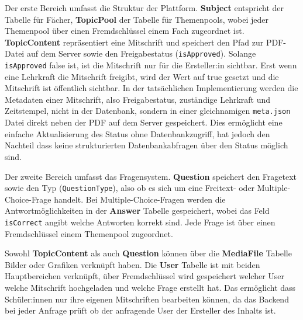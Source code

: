 Der erste Bereich umfasst die Struktur der Plattform. 
\textbf{Subject} entspricht der Tabelle für Fächer, 
\textbf{TopicPool} der Tabelle für Themenpools, wobei jeder 
Themenpool über einen Fremdschlüssel einem Fach zugeordnet ist. 
\textbf{TopicContent} repräsentiert eine Mitschrift und speichert 
den Pfad zur PDF-Datei auf dem Server sowie den Freigabestatus 
(\texttt{isApproved}). Solange \texttt{isApproved} false ist, 
ist die Mitschrift nur für die Ersteller:in sichtbar. Erst wenn 
eine Lehrkraft die Mitschrift freigibt, wird der Wert auf true 
gesetzt und die Mitschrift ist öffentlich sichtbar. In der 
tatsächlichen Implementierung werden die Metadaten einer 
Mitschrift, also Freigabestatus, zuständige Lehrkraft und 
Zeitstempel, nicht in der Datenbank, sondern in einer 
gleichnamigen \texttt{meta.json} Datei direkt neben der PDF 
auf dem Server gespeichert. Dies ermöglicht eine einfache 
Aktualisierung des Status ohne Datenbankzugriff, hat jedoch 
den Nachteil dass keine strukturierten Datenbankabfragen 
über den Status möglich sind.

Der zweite Bereich umfasst das Fragensystem. \textbf{Question} 
speichert den Fragetext sowie den Typ (\texttt{QuestionType}), 
also ob es sich um eine Freitext- oder Multiple-Choice-Frage 
handelt. Bei Multiple-Choice-Fragen werden die Antwortmöglichkeiten 
in der \textbf{Answer} Tabelle gespeichert, wobei das Feld 
\texttt{isCorrect} angibt welche Antworten korrekt sind. Jede 
Frage ist über einen Fremdschlüssel einem Themenpool zugeordnet.

Sowohl \textbf{TopicContent} als auch \textbf{Question} können 
über die \textbf{MediaFile} Tabelle Bilder oder Grafiken verknüpft 
haben. Die \textbf{User} Tabelle ist mit beiden Hauptbereichen 
verknüpft, über Fremdschlüssel wird gespeichert welcher User 
welche Mitschrift hochgeladen und welche Frage erstellt hat. 
Das ermöglicht dass Schüler:innen nur ihre eigenen Mitschriften 
bearbeiten können, da das Backend bei jeder Anfrage prüft ob 
der anfragende User der Ersteller des Inhalts ist.